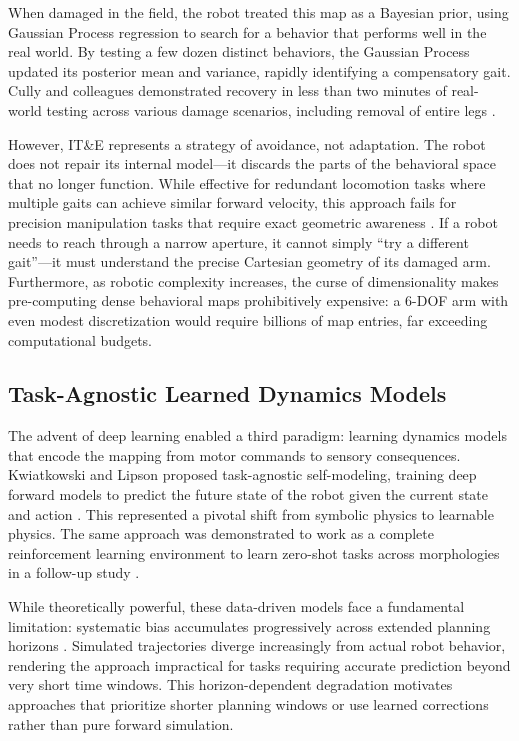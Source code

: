 \documentclass[12pt,a4paper,oneside]{report}
\begin{document}
When damaged in the field, the robot treated this map as a Bayesian prior, using Gaussian Process regression to search for a behavior that performs well in the real world. By testing a few dozen distinct behaviors, the Gaussian Process updated its posterior mean and variance, rapidly identifying a compensatory gait. Cully and colleagues demonstrated recovery in less than two minutes of real-world testing across various damage scenarios, including removal of entire legs \cite{cully2015robots}.

However, IT\&E represents a strategy of avoidance, not adaptation. The robot does not repair its internal model---it discards the parts of the behavioral space that no longer function. While effective for redundant locomotion tasks where multiple gaits can achieve similar forward velocity, this approach fails for precision manipulation tasks that require exact geometric awareness \cite{kwiatkowski2019task}. If a robot needs to reach through a narrow aperture, it cannot simply ``try a different gait''---it must understand the precise Cartesian geometry of its damaged arm. Furthermore, as robotic complexity increases, the curse of dimensionality makes pre-computing dense behavioral maps prohibitively expensive: a 6-DOF arm with even modest discretization would require billions of map entries, far exceeding computational budgets.

\subsection{Task-Agnostic Learned Dynamics Models}

The advent of deep learning enabled a third paradigm: learning dynamics models that encode the mapping from motor commands to sensory consequences. Kwiatkowski and Lipson proposed task-agnostic self-modeling, training deep forward models to predict the future state of the robot given the current state and action \cite{kwiatkowski2019task}. This represented a pivotal shift from symbolic physics to learnable physics. The same approach was demonstrated to work as a complete reinforcement learning environment to learn zero-shot tasks across morphologies in a follow-up study \cite{kwiatkowski2019zeroshot}.

While theoretically powerful, these data-driven models face a fundamental limitation: systematic bias accumulates progressively across extended planning horizons \cite{kwiatkowski2019task}. Simulated trajectories diverge increasingly from actual robot behavior, rendering the approach impractical for tasks requiring accurate prediction beyond very short time windows. This horizon-dependent degradation motivates approaches that prioritize shorter planning windows or use learned corrections rather than pure forward simulation.
\end{document}
